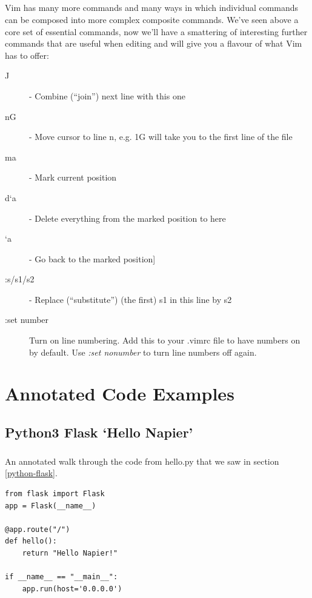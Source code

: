 \documentclass[12pt, a4paper, oneside]{book}
\begin{document}
\paragraph{} Vim has many more commands and many ways in which individual commands can be composed into more complex composite commands. We've seen above a core set of essential commands, now we'll have a smattering of interesting further commands that are useful when editing and will give you a flavour of what Vim has to offer:
\begin{description}
\item[J] - Combine (``join'') next line with this one
\item[nG] - Move cursor to line n, e.g. 1G will take you to the first line of the file
\item[ma] - Mark current position
\item[d`a] - Delete everything from the marked position to here
\item[`a] -  Go back to the marked position] 
\item[:s/s1/s2] - Replace (``substitute'') (the first) s1 in this line by s2
\item[:set number] Turn on line numbering.  Add this to your .vimrc file to have numbers on by default. Use \emph{:set nonumber} to turn line numbers off again.
\end{description}


\chapter{Annotated Code Examples}
\label{annotated}

\section{Python3 Flask `Hello Napier'}
\label{annotated_hello_napier}
\paragraph{} An annotated walk through the code from hello.py that we saw in section \ref{python-flask}.

\begin{lstlisting}
from flask import Flask 
app = Flask(__name__)

@app.route("/")
def hello():
    return "Hello Napier!"

if __name__ == "__main__":
    app.run(host='0.0.0.0')

\end{lstlisting}
\end{document}
